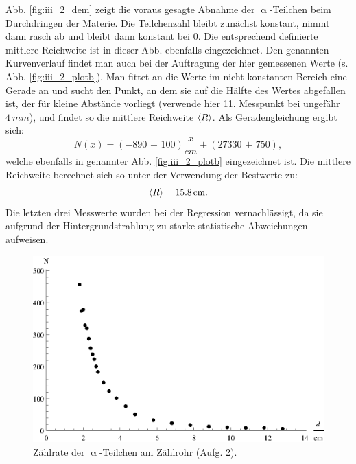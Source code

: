 Abb. \ref{fig:iii_2_dem} zeigt die voraus gesagte Abnahme der $\upalpha$-Teilchen beim Durchdringen der Materie. Die Teilchenzahl bleibt zunächst konstant, nimmt dann rasch ab und bleibt dann konstant bei 0. Die entsprechend definierte mittlere Reichweite ist in dieser Abb. ebenfalls  eingezeichnet. Den genannten Kurvenverlauf findet man auch bei der Auftragung der hier gemessenen Werte (s. Abb. \ref{fig:iii_2_plotb}). Man fittet an die Werte im nicht konstanten Bereich eine Gerade an und sucht den Punkt, an dem sie auf die Hälfte des Wertes abgefallen ist, der für kleine Abstände vorliegt (verwende hier 11. Messpunkt bei ungefähr $\SI{4}{mm}$), und findet so die mittlere Reichweite $\left\langle R \right\rangle$. Als Geradengleichung ergibt sich:
\begin{equation}
N(x) = (\num{-890(100)})\frac{x}{\si{cm}} + (\num{27330(750)}),
\end{equation}
welche ebenfalls in genannter Abb. \ref{fig:iii_2_plotb} eingezeichnet ist. Die mittlere Reichweite berechnet sich so unter der Verwendung der Bestwerte zu:
\begin{equation}
\left\langle R \right\rangle = \SI{15,8}{cm}.
\end{equation}
Die letzten drei Messwerte wurden bei der Regression vernachlässigt, da sie aufgrund der Hintergrundstrahlung zu starke statistische Abweichungen aufweisen.

\begin{figure}[tb]
	\centering
	\includegraphics[scale=1.0]{fig/iii_2_plota.eps}
	\caption{Zählrate der $\upalpha$-Teilchen am Zählrohr (Aufg. 2).}
	\label{fig:iii_2_plota}
\end{figure}

